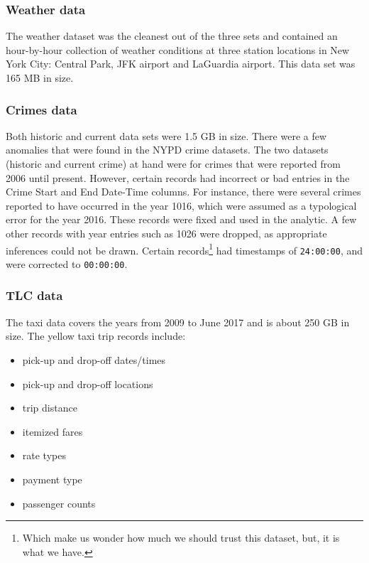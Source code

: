 \documentclass{sigkddExp}
\begin{document}
\subsubsection{Weather data} 

The weather dataset was the cleanest out of the three sets and contained an hour-by-hour collection of weather conditions at three station locations in New York City: Central Park, JFK airport and LaGuardia airport. This data set was 165 MB in size. 


\subsubsection{Crimes data}
Both historic and current data sets were 1.5 GB in size. There were a few anomalies that were found in the NYPD crime datasets. The two datasets (historic and current crime) at hand were for crimes that were reported from 2006 until present. However, certain records had incorrect or bad entries in the Crime Start and End Date-Time columns. For instance, there were several crimes reported to have occurred in the year 1016, which were assumed as a typological error for the year 2016. These records were fixed and used in the analytic. A few other records with year entries such as 1026 were dropped, as appropriate inferences could not be drawn. Certain records\footnote{Which make us wonder how much we should trust this dataset, but, it is what we have.} had timestamps of \texttt{24:00:00}, and were corrected to \texttt{00:00:00}. 

\subsubsection{TLC data}

The taxi data covers the years from 2009 to June 2017 and is about 250 GB in size. The yellow taxi trip records include:

\begin{itemize}
\item pick-up and drop-off dates/times 
\item pick-up and drop-off locations 
\item trip distance
\item itemized fares 
\item rate types 
\item payment type 
\item passenger counts 
\end{itemize}
\end{document}
